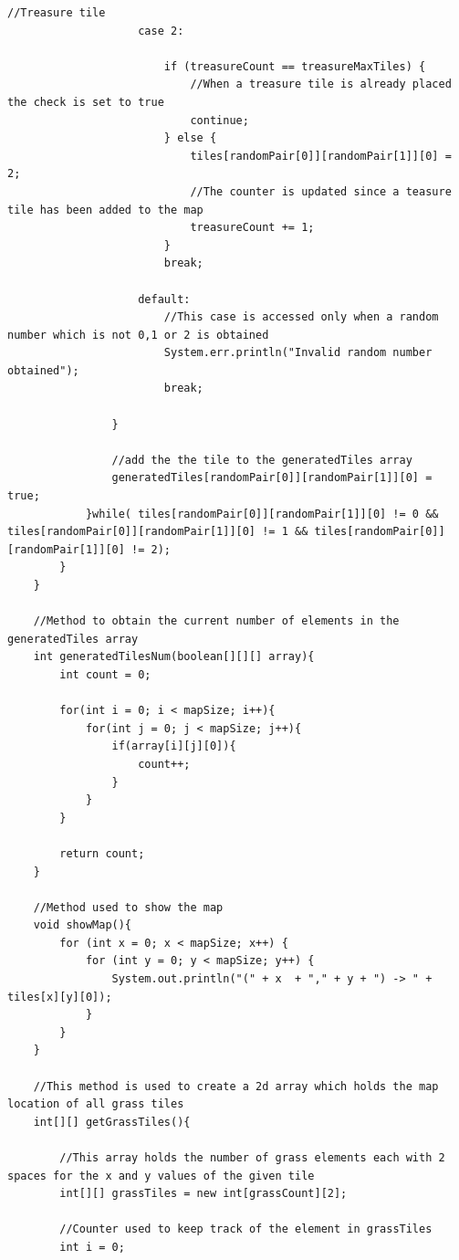 \documentclass[a4paper,12pt]{extarticle}
\begin{document}
\begin{lstlisting}[caption=The initial code of the Map class]
                    //Treasure tile
                    case 2:

                        if (treasureCount == treasureMaxTiles) {
                            //When a treasure tile is already placed the check is set to true
                            continue;
                        } else {
                            tiles[randomPair[0]][randomPair[1]][0] = 2;
                            //The counter is updated since a teasure tile has been added to the map
                            treasureCount += 1;
                        }
                        break;

                    default:
                        //This case is accessed only when a random number which is not 0,1 or 2 is obtained
                        System.err.println("Invalid random number obtained");
                        break;

                }

                //add the the tile to the generatedTiles array
                generatedTiles[randomPair[0]][randomPair[1]][0] = true;
            }while( tiles[randomPair[0]][randomPair[1]][0] != 0 && tiles[randomPair[0]][randomPair[1]][0] != 1 && tiles[randomPair[0]][randomPair[1]][0] != 2);
        }
    }

    //Method to obtain the current number of elements in the generatedTiles array
    int generatedTilesNum(boolean[][][] array){
        int count = 0;

        for(int i = 0; i < mapSize; i++){
            for(int j = 0; j < mapSize; j++){
                if(array[i][j][0]){
                    count++;
                }
            }
        }

        return count;
    }

    //Method used to show the map
    void showMap(){
        for (int x = 0; x < mapSize; x++) {
            for (int y = 0; y < mapSize; y++) {
                System.out.println("(" + x  + "," + y + ") -> " + tiles[x][y][0]);
            }
        }
    }

    //This method is used to create a 2d array which holds the map location of all grass tiles
    int[][] getGrassTiles(){

        //This array holds the number of grass elements each with 2 spaces for the x and y values of the given tile
        int[][] grassTiles = new int[grassCount][2];

        //Counter used to keep track of the element in grassTiles
        int i = 0;


\end{lstlisting}
\end{document}
